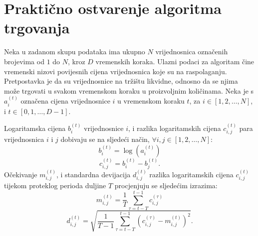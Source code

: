 \documentclass[lmodern, utf8, diplomski, numeric]{fer}
\newcommand{\q}{\left}
\newcommand{\w}{\right}
\begin{document}
\chapter{Praktično ostvarenje algoritma trgovanja}
\label{ch:algoritam}
  Neka u zadanom skupu podataka ima ukupno $N$ vrijednosnica označenih brojevima od $1$ do $N$, kroz $D$ vremenskih koraka.
  Ulazni podaci za algoritam čine vremenski nizovi povijesnih cijena vrijednosnica koje su na raspolaganju.
  Pretpostavka je da su vrijednosnice na tržištu likvidne, odnosno da se njima može trgovati u svakom vremenskom koraku u proizvoljnim količinama.
  Neka je s $a_i^{\q(t\w)}$ označena cijena vrijednosnice $i$ u vremenskom koraku $t$, za $i \in {\q[1, 2, \ldots, N\w]}$, i $t \in {\q[0, 1, \ldots, D-1\w]}$.
  
  Logaritamska cijena $b_i^{\q(t\w)}$ vrijednosnice $i$, i razlika logaritamskih cijena $c_{i,j}^{\q(t\w)}$ para vrijednosnica $i$ i $j$ dobivaju se na sljedeći način, $\forall i, j \in \q[1, 2, \ldots, N\w]$:
  \begin{equation}
    \label{eq:log_price}
  b_i^{\q(t\w)} = \log\q(a_i^{\q(t\w)}\w)
  \end{equation}
  \begin{equation}
    \label{eq:log_price_diff}
    c_{i,j}^{\q(t\w)} = b_i^{\q(t\w)} - b_j^{\q(t\w)}.
  \end{equation}
  Očekivanje $m_{i,j}^{\q(t\w)}$, i standardna devijacija $d_{i,j}^{\q(t\w)}$ razlika logaritamskih cijena $c_{i,j}^{\q(t\w)}$ tijekom proteklog perioda duljine $T$ procjenjuju se sljedećim izrazima:
  \begin{equation}
  \label{eq:mean}
    m_{i,j}^{\q(t\w)} = \frac{1}{T}\sum_{\tau = t - T}^{t - 1} c_{i,j}^{(\tau)}
  \end{equation}
  \begin{equation}
  \label{eq:deviation}
    d_{i,j}^{\q(t\w)} = \sqrt{\frac{1}{T - 1}\sum_{\tau=t - T}^{t - 1} \q(c_{i,j}^{(\tau)} - m_{i,j}^{\q(t\w)} \w)^2}.
  \end{equation}
  
\end{document}
